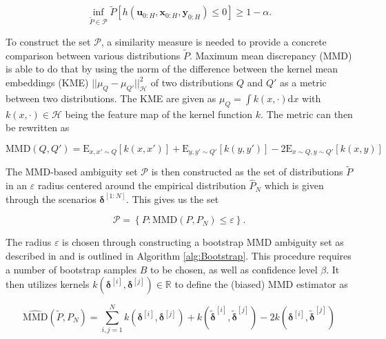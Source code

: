 \begin{equation} \label{wc constraints}
\inf\limits_{\tilde{P} \in \mathcal{P}}\tilde{P} \left[ h(\boldsymbol{u}_{0:H},  \boldsymbol{x}_{0:H},  \boldsymbol{y}_{0:H}) \leq 0 \right] \geq 1 - \alpha.
\end{equation}

To construct the set $\mathcal{P}$, a similarity measure is needed to provide a concrete comparison between various distributions $\tilde{P}$. Maximum mean discrepancy (MMD) \cite{Arthur_12} is able to do that by using the norm of the difference between the kernel mean embeddings (KME) $|| \mu_Q - \mu_{Q'} ||^2_{\mathcal{H}}$ of two distributions $Q$ and $Q'$ as a metric between two distributions. The KME are given as $\mu_Q = \int k(x, \cdot) \text{d}x$ with $k(x, \cdot) \in \mathcal{H}$ being the feature map of the kernel function $k$. The metric can then be rewritten as 

\begin{equation} \label{MMD Kernel}
\text{MMD}(Q, Q') = \text{E}_{x,x' \sim Q}[k(x,x')] + \text{E}_{y,y' \sim Q'}[k(y,y')] - 2\text{E}_{x\sim Q, y \sim Q'}[k(x,y)]
\end{equation}

The MMD-based ambiguity set $\mathcal{P}$ is then constructed as the set of distributions $\tilde{P}$ in an $\varepsilon$ radius centered around the empirical distribution $\hat{P}_N$ which is given through the scenarios $\boldsymbol{\delta}^{[1:N]}$. This gives us the set

\begin{equation} \label{ambiguity set}
\mathcal{P} =  \left\{ P : \text{MMD} (P, P_N) \leq \varepsilon \right\}.
\end{equation}

The radius $\varepsilon$ is chosen through constructing a bootstrap MMD ambiguity set as described in \cite{Yassine_22} and is outlined in Algorithm \ref{alg:Bootstrap}. This procedure requires a number of bootstrap samples $B$ to be chosen, as well as confidence level $\beta$. It then utilizes kernels $k(\boldsymbol{\delta}^{[i]}, \boldsymbol{\delta}^{[j]}) \in \mathbb{R}$ to define the (biased) MMD estimator as 

\begin{equation} \label{ambiguity set approx}
\widehat{\text{MMD}} (\tilde{P}, P_N) = \sum_{i,j = 1}^N k(\boldsymbol{\delta}^{[i]}, \boldsymbol{\delta}^{[j]}) + k(\tilde{\boldsymbol{\delta}}^{[i]}, \tilde{\boldsymbol{\delta}}^{[j]}) - 2 k(\boldsymbol{\delta}^{[i]}, \tilde{\boldsymbol{\delta}}^{[j]})
\end{equation}

